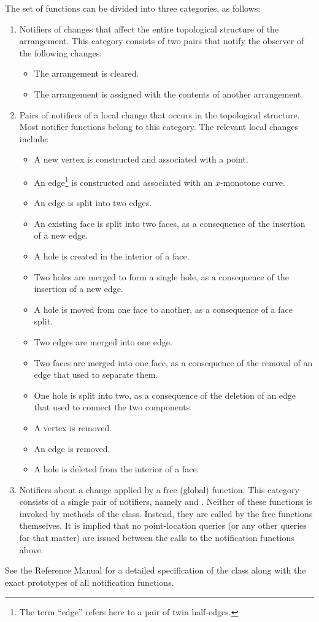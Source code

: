 The set of functions can be divided into three categories, as
follows:
\begin{enumerate}
\item Notifiers of changes that affect the entire topological structure
of the arrangement. This category consists of two pairs that
notify the observer of the following changes:
\begin{itemize}
\item The arrangement is cleared.
\item The arrangement is assigned with the contents of another
arrangement.
\end{itemize}
\item Pairs of notifiers of a local change that occurs in the
topological structure. Most notifier functions belong to this
category. The relevant local changes include:
\begin{itemize}
\item A new vertex is constructed and associated with a point.
\item An edge\footnote{The term ``edge'' refers here to a pair of twin
half-edges.} is constructed and associated with an $x$-monotone
curve.
\item An edge is split into two edges.
\item An existing face is split into two faces, as a consequence of the
insertion of a new edge.
\item A hole is created in the interior of a face.
\item Two holes are merged to form a single hole, as a consequence of the
insertion of a new edge.
\item A hole is moved from one face to another, as a consequence of
a face split.
\item Two edges are merged into one edge.
\item Two faces are merged into one face, as a consequence of the
removal of an edge that used to separate them.
\item One hole is split into two, as a consequence of the deletion of an 
edge that used to connect the two components.
\item A vertex is removed.
\item An edge is removed.
\item A hole is deleted from the interior of a face.
\end{itemize}
\item Notifiers about a change applied by a free (global) function.
This category consists of a single pair of notifiers, namely
 and . Neither of
these functions is invoked by methods of the  class. 
Instead, they are called by the free functions themselves. It is implied 
that no point-location queries (or any other queries for that matter)
are issued between the calls to the notification functions above.
\end{enumerate}
See the Reference Manual for a detailed specification of the
 class along with the exact prototypes of all
notification functions.

